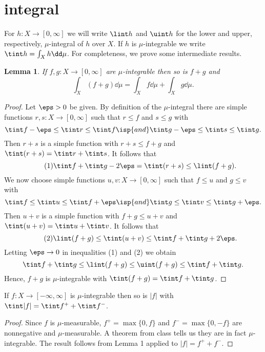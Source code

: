\documentclass[12pt]{article}
\newtheorem{lemma}{Lemma}
\begin{document}
\section{integral}


For $h : X \to [0, \infty]$ we will write $\lint h$ and $\uint h$ for the lower and upper, respectively, $\mu$-integral of $h$ over $X$.
If $h$ is $\mu$-integrable we write $\tint h = \int_X h \dd\mu$.
For completeness, we prove some intermediate results.

\begin{lemma}
    If $f, g : X \to [0, \infty]$ are $\mu$-integrable then so is $f + g$ and
    \[
        \int_X (f + g) \dd\mu = \int_X f \dd\mu + \int_X g \dd\mu.
    \]
\end{lemma}

\begin{proof}
    Let $\eps > 0$ be given. By definition of the $\mu$-integral there are simple functions $r, s : X \to [0, \infty]$ such that $r \leq f$ and $s \leq g$ with
    \[
        \tint f - \eps \leq \tint r \leq \tint f
        \isp{and}
        \tint g - \eps \leq \tint s \leq \tint g.
    \]
    Then $r + s$ is a simple function with $r + s \leq f + g$ and $\tint(r + s) = \tint r + \tint s$.
    It follows that
    \[\tag{1}
        \tint f + \tint g - 2\eps
            = \tint (r + s)
            \leq \lint (f + g).
    \]
    We now choose simple functions $u, v : X \to [0, \infty]$ such that $f \leq u$ and $g \leq v$ with
    \[
        \tint f \leq \tint u \leq \tint f + \eps
        \isp{and}
        \tint g \leq \tint v \leq \tint g + \eps.
    \]
    Then $u + v$ is a simple function with $f + g \leq u + v$ and $\tint (u + v) = \tint u + \tint v$.
    It follows that
    \[\tag{2}
        \lint (f + g)
            \leq \tint (u + v)
            \leq \tint f + \tint g + 2\eps.
    \]
    Letting $\eps \to 0$ in inequalities (1) and (2) we obtain
    \[
        \tint f + \tint g \leq \lint (f + g) \leq \uint (f + g) \leq \tint f + \tint g.
    \]
    Hence, $f + g$ is $\mu$-integrable with $\tint (f + g) = \tint f + \tint g$.
\end{proof}

\begin{corollary}
    If $f : X \to [-\infty, \infty]$ is $\mu$-integrable then so is $|f|$ with $\tint |f| = \tint f^+ + \tint f^-$.
\end{corollary}

\begin{proof}
    Since $f$ is $\mu$-measurable, $f^+ = \max\{0, f\}$ and $f^- = \max\{0, -f\}$ are nonnegative and $\mu$-measurable.
    A theorem from class tells us they are in fact $\mu$-integrable. The result follows from Lemma 1 applied to $|f| = f^+ + f^-$.
\end{proof}
\end{document}
